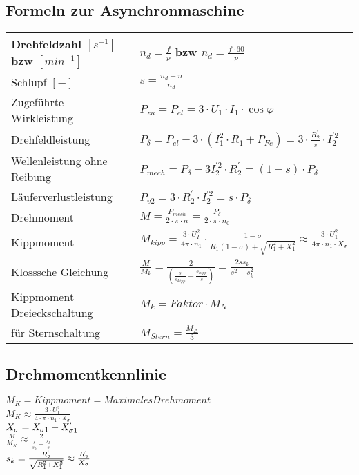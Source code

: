      
     
    \subsection{Formeln zur Asynchronmaschine}
    \begin{tabular}[c]{ | p{6cm} | p{9cm} |}
    	\hline
    	Drehfeldzahl $[s^{-1}]$ bzw $[min^{-1}]$ & $n_d=\frac{f}{p}$ bzw
    	$n_d=\frac{f\cdot 60}{p}$\\
    	\hline
    	Schlupf $[-]$ & $s=\frac{n_d-n}{n_d}$\\
    	\hline
    	Zugeführte Wirkleistung & $P_{zu}= P_{el}=3\cdot U_1 \cdot I_1 \cdot
    	\cos\varphi$\\
    	\hline
    	Drehfeldleistung & $P_\delta=P_{el}-3\cdot\left(I_1^2\cdot R_1 +
    	P_{Fe}\right)=3\cdot\frac{R_2^\prime}{s}\cdot I_2^{\prime 2}$\\
    	\hline
    	Wellenleistung ohne Reibung & $P_{mech}=P_\delta-3I_2^{\prime 2}\cdot
    	R_2^\prime=(1-s)\cdot P_\delta$\\
    	\hline
    	Läuferverlustleistung & $P_{v2}=3\cdot R_2^\prime\cdot I_2^{\prime
    	2}=s\cdot P_\delta$\\
    	\hline
    	Drehmoment & $M=\frac{P_{mech}}{2\cdot\pi\cdot
    	n}=\frac{P_\delta}{2\cdot\pi\cdot n_0}$\\
    	\hline
    	Kippmoment & $M_{kipp}=\frac{3\cdot U_I^2}{4\pi\cdot
    	n_1}\cdot\frac{1-\sigma}{R_1(1-\sigma)+\sqrt{R_1^2+X_1^2}}\approx\frac{3\cdot
    	U_1^2}{4\pi\cdot n_1 \cdot X_\sigma}$\\
    	\hline
    	Klosssche Gleichung &
    	$\frac{M}{M_k}=\frac{2}{\left(\frac{s}{s_{kipp}}+\frac{s_{kipp}}{s}\right)}=\frac{2
    	s s_k}{s^2+s_k^2} $\\
    	\hline
    	Kippmoment Dreieckschaltung& $M_k= Faktor \cdot M_N$\\
    	\hline
    	für Sternschaltung & $M_{Stern}= \frac{M_\Delta}{3}$\\
    	\hline
    \end{tabular}
    
    \subsection{Drehmomentkennlinie}
        \begin{minipage}{5cm}
        \end{minipage}
        \begin{minipage}{13cm}
            $M_K = Kippmoment = Maximales Drehmoment$ \\
            $M_K \approx \frac{3 \cdot U_1^2}{4\cdot \pi \cdot n_1 \cdot X_\sigma}$ \\
            $X_\sigma = X_{\sigma 1} + X_{\sigma 1}^`$ \\
            $\frac{M}{M_K}\approx \frac{2}{\frac{s}{s_k}+\frac{s_k}{s}}$ \\
            $s_k = \frac{R_2^`}{\sqrt{R_1^2 + X_1^2}} \approx \frac{R_2^`}{X_\sigma}$    
        \end{minipage}
        \newpage

